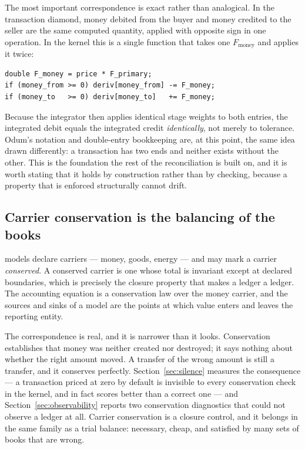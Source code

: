 \documentclass[11pt,a4paper]{article}
\begin{document}
The most important correspondence is exact rather than analogical. In the transaction diamond, money debited from the buyer and money credited to the seller are the same computed quantity, applied with opposite sign in one operation. In the kernel this is a single function that takes one $F_{\text{money}}$ and applies it twice:
\begin{lstlisting}[style=c]
double F_money = price * F_primary;
if (money_from >= 0) deriv[money_from] -= F_money;
if (money_to   >= 0) deriv[money_to]   += F_money;
\end{lstlisting}
Because the integrator then applies identical stage weights to both entries, the integrated debit equals the integrated credit \emph{identically}, not merely to tolerance. Odum's notation and double-entry bookkeeping are, at this point, the same idea drawn differently: a transaction has two ends and neither exists without the other. This is the foundation the rest of the reconciliation is built on, and it is worth stating that it holds by construction rather than by checking, because a property that is enforced structurally cannot drift.

\subsection{Carrier conservation is the balancing of the books}
\label{sec:conservation}

\gssk{} models declare carriers --- money, goods, energy --- and may mark a carrier \emph{conserved}. A conserved carrier is one whose total is invariant except at declared boundaries, which is precisely the closure property that makes a ledger a ledger. The accounting equation is a conservation law over the money carrier, and the sources and sinks of a \gssk{} model are the points at which value enters and leaves the reporting entity.

The correspondence is real, and it is narrower than it looks. Conservation establishes that money was neither created nor destroyed; it says nothing about whether the right amount moved. A transfer of the wrong amount is still a transfer, and it conserves perfectly. Section~\ref{sec:silence} measures the consequence --- a transaction priced at zero by default is invisible to every conservation check in the kernel, and in fact scores better than a correct one --- and Section~\ref{sec:observability} reports two conservation diagnostics that could not observe a ledger at all. Carrier conservation is a closure control, and it belongs in the same family as a trial balance: necessary, cheap, and satisfied by many sets of books that are wrong.
\end{document}
